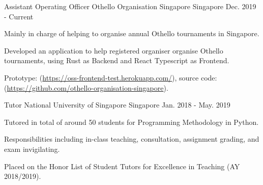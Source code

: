 

\begin{cventries}

  \cventry
    {Assistant Operating Officer} %
    {Othello Organisation Singapore} %
    {Singapore} %
    {Dec. 2019 - Current} %
    {
      \begin{cvitems} %
        \item {Mainly in charge of helping to organise annual Othello tournaments in Singapore.}
        \item {Developed an application to help registered organiser organise Othello tournaments, using Rust as Backend and React Typescript as Frontend.}
        \item {Prototype: (\url{https://oss-frontend-test.herokuapp.com/}), source code: (\url{https://github.com/othello-organisation-singapore}).}
      \end{cvitems}
    }

  \cventry
    {Tutor} %
    {National University of Singapore} %
    {Singapore} %
    {Jan. 2018 - May. 2019} %
    {
      \begin{cvitems} %
        \item {Tutored in total of around 50 students for Programming Methodology in Python.}
        \item {Responsibilities including in-class teaching, consultation, assignment grading, and exam invigilating.}
        \item {Placed on the Honor List of Student Tutors for Excellence in Teaching (AY 2018/2019).}
      \end{cvitems}
    }

\end{cventries}
